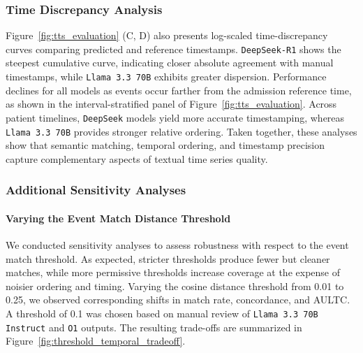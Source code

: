 \documentclass[pdflatex,sn-mathphys-num]{sn-jnl}%
\theoremstyle{thmstyleone}%
\theoremstyle{thmstyletwo}%
\theoremstyle{thmstylethree}%
\begin{document}
\subsubsection{Time Discrepancy Analysis}
\label{sec:time-descrepancy-analysis}
Figure~\ref{fig:tts_evaluation} (C, D) also presents log-scaled time-discrepancy curves comparing predicted and reference timestamps. \texttt{DeepSeek-R1} shows the steepest cumulative curve, indicating closer absolute agreement with manual timestamps, while \texttt{Llama 3.3 70B} exhibits greater dispersion. Performance declines for all models as events occur farther from the admission reference time, as shown in the interval-stratified panel of Figure~\ref{fig:tts_evaluation}. Across patient timelines, \texttt{DeepSeek} models yield more accurate timestamping, whereas \texttt{Llama 3.3 70B} provides stronger relative ordering. Taken together, these analyses show that semantic matching, temporal ordering, and timestamp precision capture complementary aspects of textual time series quality.


\subsubsection{Additional Sensitivity Analyses}
\label{sec:additional-sensitivity-analyses}


\paragraph{Varying the Event Match Distance Threshold}
We conducted sensitivity analyses to assess robustness with respect to the event match threshold. As expected, stricter thresholds produce fewer but cleaner matches, while more permissive thresholds increase coverage at the expense of noisier ordering and timing. Varying the cosine distance threshold from 0.01 to 0.25, we observed corresponding shifts in match rate, concordance, and AULTC. A threshold of 0.1 was chosen based on manual review of \texttt{Llama 3.3 70B Instruct} and \texttt{O1} outputs. The resulting trade-offs are summarized in Figure~\ref{fig:threshold_temporal_tradeoff}.
\end{document}
